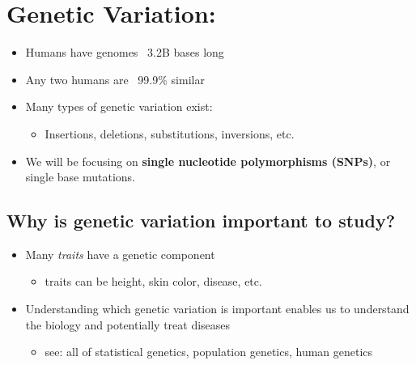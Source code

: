 \documentclass[10pt]{article}
\begin{document}
\section*{Genetic Variation:}
\begin{itemize}
    \item Humans have genomes ~3.2B bases long
    \item Any two humans are ~99.9\% similar
    \item Many types of genetic variation exist:
    \begin{itemize}
        \item Insertions, deletions, substitutions, inversions, etc.
    \end{itemize}
    \item We will be focusing on \textbf{single nucleotide polymorphisms (SNPs)}, or single base mutations.
\end{itemize}

\subsection*{Why is genetic variation important to study?}
\begin{itemize}
    \item Many \textit{traits} have a genetic component
    \begin{itemize}
        \item traits can be height, skin color, disease, etc.
    \end{itemize}
    \item Understanding which genetic variation is important enables us to understand the biology and potentially treat diseases
    \begin{itemize}
        \item see: all of statistical genetics, population genetics, human genetics
    \end{itemize}
\end{itemize}
\end{document}
